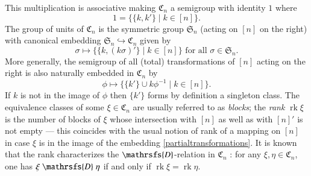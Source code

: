 \documentclass[preprint,1p,times]{elsarticle}
\DeclareMathOperator{\rk}{rk} \DeclareMathOperator{\tr}{tr}
\numberwithin{equation}{section}
\theoremstyle{remark}
\def\Dc{\mathrsfs{D}}
\def\si{\sigma}
\def\C{\mathfrak{C}}
\def\Sim{\mathfrak{S}}
\begin{document}
This multiplication is associative making $\C_n$ a semigroup with identity $1$ where
$$1=\{\{k,k'\}\mid k\in [n]\}.$$
The group of units of $\C_n$ is the symmetric group $\Sim_n$ (acting on $[n]$ on the right) with canonical embedding
$\Sim_n\hookrightarrow \C_n$ given by
$$\sigma\mapsto \{\{k,(k\si)'\}\mid k\in [n]\} \text{ for all } \si\in
\Sim_n.$$ More generally, the semigroup of all (total) transformations of $[n]$ acting on the right is also naturally
embedded in $\C_n$ by
\begin{equation}
\label{partialtransformations} \phi\mapsto \{\{k'\}\cup
k\phi^{-1}\mid k\in [n]\}.
\end{equation}
If $k$ is not in the image of $\phi$ then $\{k'\}$ forms by definition a singleton class. The equivalence classes of
some $\xi\in \C_n$ are usually referred to as \emph{blocks}; the \emph{rank} $\rk\xi$ is the number of blocks of $\xi$
whose intersection with $[n]$ as well as with $[n]'$ is not empty --- this coincides with the usual notion of rank of a
mapping on $[n]$ in case $\xi$ is in the image of the embedding \eqref{partialtransformations}. It is  known that the
rank characterizes the $\Dc$-relation in $\C_n$ \cite{Maz1,KM2}: for any $\xi,\eta\in\C_n$, one has
$\xi\mathrel{\Dc}\eta$ if and only if $\rk\xi=\rk\eta$.
\end{document}
